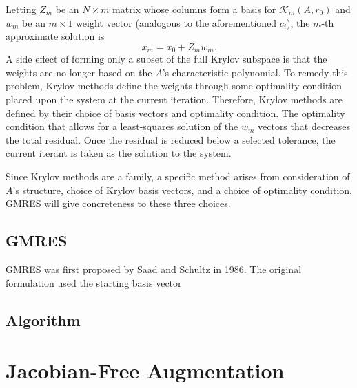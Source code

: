 \documentclass[Prelim,12pt]{WisconsinThesis}
\newcommand{\by}    {\!\times\!}
\begin{document}
Letting $Z_m$ be an $N \by m$ matrix whose columns form a basis for $\mathcal{K}_m(A,r_0)$ and $w_m$ be an $m \by 1$ weight vector (analogous to the aforementioned $c_i$), the $m$-th approximate solution is
\begin{equation}
    x_m = x_0 + Z_m w_m.
    \label{Eqn:ApproximateKrylovSolution}
\end{equation}
A side effect of forming only a subset of the full Krylov subspace is that the weights are no longer based on the $A$'s characteristic polynomial.
To remedy this problem, Krylov methods define the weights through some optimality condition placed upon the system at the current iteration.
Therefore, Krylov methods are defined by their choice of basis vectors and optimality condition.
The optimality condition that allows for a least-squares solution of the $w_m$ vectors that decreases the total residual.
Once the residual is reduced below a selected tolerance, the current iterant is taken as the solution to the system.

Since Krylov methods are a family, a specific method arises from consideration of $A$'s structure, choice of Krylov basis vectors, and a choice of optimality condition.
GMRES will give concreteness to these three choices.


\subsection{GMRES}
GMRES was first proposed by Saad and Schultz in 1986.
The original formulation used the starting basis vector $ $


\subsection{Algorithm}


\section{Jacobian-Free Augmentation}
\end{document}
